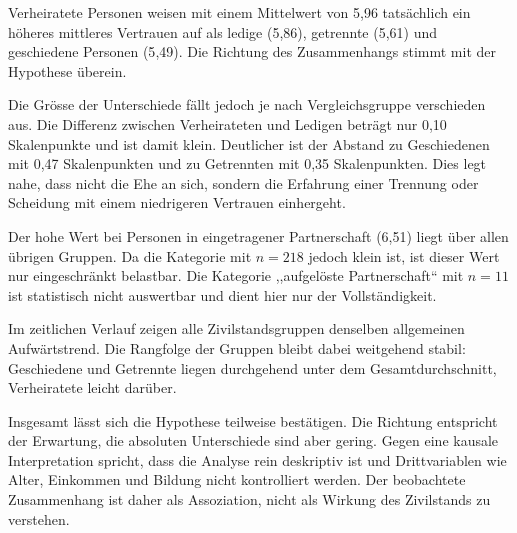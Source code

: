 Verheiratete Personen weisen mit einem Mittelwert von 5{,}96 tatsächlich ein höheres
mittleres Vertrauen auf als ledige (5{,}86), getrennte (5{,}61) und geschiedene
Personen (5{,}49). Die Richtung des Zusammenhangs stimmt mit der Hypothese überein.

Die Grösse der Unterschiede fällt jedoch je nach Vergleichsgruppe verschieden aus. Die
Differenz zwischen Verheirateten und Ledigen beträgt nur 0{,}10 Skalenpunkte und ist
damit klein. Deutlicher ist der Abstand zu Geschiedenen mit 0{,}47 Skalenpunkten und
zu Getrennten mit 0{,}35 Skalenpunkten. Dies legt nahe, dass nicht die Ehe an sich,
sondern die Erfahrung einer Trennung oder Scheidung mit einem niedrigeren Vertrauen
einhergeht.

Der hohe Wert bei Personen in eingetragener Partnerschaft (6{,}51) liegt über allen
übrigen Gruppen. Da die Kategorie mit $n = 218$ jedoch klein ist, ist dieser Wert nur
eingeschränkt belastbar. Die Kategorie ,,aufgelöste Partnerschaft`` mit $n = 11$ ist
statistisch nicht auswertbar und dient hier nur der Vollständigkeit.

Im zeitlichen Verlauf zeigen alle Zivilstandsgruppen denselben allgemeinen
Aufwärtstrend. Die Rangfolge der Gruppen bleibt dabei weitgehend stabil: Geschiedene
und Getrennte liegen durchgehend unter dem Gesamtdurchschnitt, Verheiratete leicht
darüber.

Insgesamt lässt sich die Hypothese teilweise bestätigen. Die Richtung entspricht der
Erwartung, die absoluten Unterschiede sind aber gering. Gegen eine kausale Interpretation
spricht, dass die Analyse rein deskriptiv ist und Drittvariablen wie Alter, Einkommen
und Bildung nicht kontrolliert werden. Der beobachtete Zusammenhang ist daher als
Assoziation, nicht als Wirkung des Zivilstands zu verstehen.
